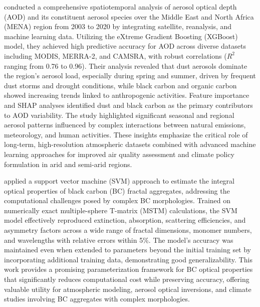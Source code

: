 \documentclass[11pt]{article}
\begin{document}
\citet{berhane2024comprehensive} conducted a comprehensive spatiotemporal analysis of aerosol optical depth (AOD) and its constituent aerosol species over the Middle East and North Africa (MENA) region from 2003 to 2020 by integrating satellite, reanalysis, and machine learning data. Utilizing the eXtreme Gradient Boosting (XGBoost) model, they achieved high predictive accuracy for AOD across diverse datasets including MODIS, MERRA-2, and CAMSRA, with robust correlations (\( R^{2} \) ranging from 0.76 to 0.96). Their analysis revealed that dust aerosols dominate the region’s aerosol load, especially during spring and summer, driven by frequent dust storms and drought conditions, while black carbon and organic carbon showed increasing trends linked to anthropogenic activities. Feature importance and SHAP analyses identified dust and black carbon as the primary contributors to AOD variability. The study highlighted significant seasonal and regional aerosol patterns influenced by complex interactions between natural emissions, meteorology, and human activities. These insights emphasize the critical role of long-term, high-resolution atmospheric datasets combined with advanced machine learning approaches for improved air quality assessment and climate policy formulation in arid and semi-arid regions.

\citet{luo2018applying} applied a support vector machine (SVM) approach to estimate the integral optical properties of black carbon (BC) fractal aggregates, addressing the computational challenges posed by complex BC morphologies. Trained on numerically exact multiple-sphere T-matrix (MSTM) calculations, the SVM model effectively reproduced extinction, absorption, scattering efficiencies, and asymmetry factors across a wide range of fractal dimensions, monomer numbers, and wavelengths with relative errors within 5\%. The model’s accuracy was maintained even when extended to parameters beyond the initial training set by incorporating additional training data, demonstrating good generalizability. This work provides a promising parameterization framework for BC optical properties that significantly reduces computational cost while preserving accuracy, offering valuable utility for atmospheric modeling, aerosol optical inversions, and climate studies involving BC aggregates with complex morphologies.
\end{document}
